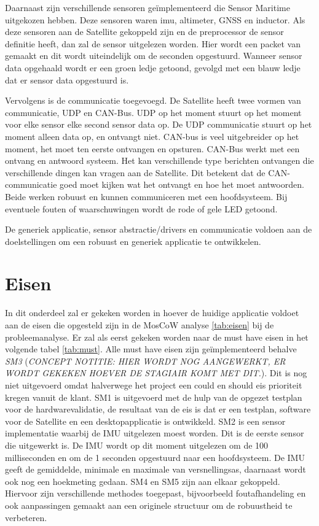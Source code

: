 \noindent Daarnaast zijn verschillende sensoren geïmplementeerd die Sensor Maritime uitgekozen hebben. Deze sensoren waren imu, altimeter, GNSS en inductor. Als deze sensoren aan de Satellite gekoppeld zijn en de preprocessor de sensor definitie heeft, dan zal de sensor uitgelezen worden. Hier wordt een packet van gemaakt en dit wordt uiteindelijk om de seconden opgestuurd. Wanneer sensor data opgehaald wordt er een groen ledje getoond, gevolgd met een blauw ledje dat er sensor data opgestuurd is. \newline

\noindent Vervolgens is de communicatie toegevoegd. De Satellite heeft twee vormen van communicatie, UDP en CAN-Bus. UDP op het moment stuurt op het moment voor elke sensor elke second sensor data op. De UDP communicatie stuurt op het moment alleen data op, en ontvangt niet. CAN-bus is veel uitgebreider op het moment, het moet ten eerste ontvangen en opsturen. CAN-Bus werkt met een ontvang en antwoord systeem. Het kan verschillende type berichten ontvangen die verschillende dingen kan vragen aan de Satellite. Dit betekent dat de CAN-communicatie goed moet kijken wat het ontvangt en hoe het moet antwoorden. Beide werken robuust en kunnen communiceren met een hoofdsysteem. Bij eventuele fouten of waarschuwingen wordt de rode of gele LED getoond. \newline

\noindent De generiek applicatie, sensor abstractie/drivers en communicatie voldoen aan de doelstellingen om een robuust en generiek applicatie te ontwikkelen.

\newpage
\section{Eisen}
In dit onderdeel zal er gekeken worden in hoever de huidige applicatie voldoet aan de eisen die opgesteld zijn in de MosCoW analyse \ref{tab:eisen} bij de probleemanalyse. Er zal als eerst gekeken worden naar de must have eisen in het volgende tabel \ref{tab:must}. Alle must have eisen zijn geïmplementeerd behalve \textit{SM3} (\textit{CONCEPT NOTITIE: HIER WORDT NOG AANGEWERKT, ER WORDT GEKEKEN HOEVER DE STAGIAIR KOMT MET DIT.}). Dit is nog niet uitgevoerd omdat halverwege het project een could en should eis prioriteit kregen vanuit de klant. SM1 is uitgevoerd met de hulp van de opgezet testplan voor de hardwarevalidatie, de resultaat van de eis is dat er een testplan, software voor de Satellite en een desktopapplicatie is ontwikkeld. SM2 is een sensor implementatie waarbij de IMU uitgelezen moest worden. Dit is de eerste sensor die uitgewerkt is. De IMU wordt op dit moment uitgelezen om de 100 milliseconden en om de 1 seconden opgestuurd naar een hoofdsysteem. De IMU geeft de gemiddelde, minimale en maximale van versnellingsas, daarnaast wordt ook nog een hoekmeting gedaan. SM4 en SM5 zijn aan elkaar gekoppeld. Hiervoor zijn verschillende methodes toegepast, bijvoorbeeld foutafhandeling en ook aanpassingen gemaakt aan een originele structuur om de robuustheid te verbeteren. 


